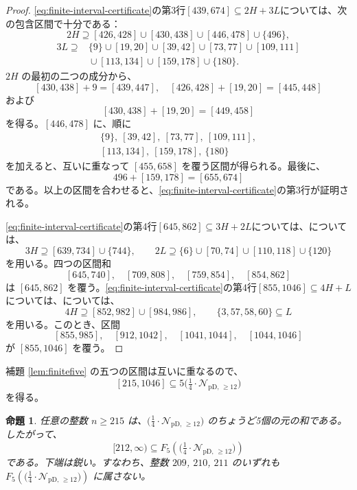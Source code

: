 \documentclass[12pt]{ltjsarticle}
\theoremstyle{plain}
\newtheorem{proposition}[theorem]{命題}
\newcommand{\Pset}{\bigl(\tfrac14\cdot
  \mathcal{N}_{\mathrm{pD},\,\geq12}\bigr)}
\begin{document}
\begin{proof}
\eqref{eq:finite-interval-certificate}の第3行$[439,674]\subseteq2H+3L$については、次の包含区間で十分である：
\[
 2H\supseteq[426,428]\cup[430,438]\cup[446,478]\cup\{496\},
\]
\[
\begin{split}
3L\supseteq{}&\{9\}\cup[19,20]\cup[39,42]\cup[73,77]
 \cup[109,111]\\
 &{}\cup[113,134]\cup[159,178]\cup\{180\}.
\end{split}
\]
$2H$ の最初の二つの成分から、
\[
 [430,438]+9=[439,447],\quad
 [426,428]+[19,20]=[445,448]
\]
および
\[
 [430,438]+[19,20]=[449,458]
\]
を得る。$[446,478]$ に、順に
\[
\begin{gathered}
 \{9\},\ [39,42],\ [73,77],\ [109,111],\\
 [113,134],\ [159,178],\ \{180\}
\end{gathered}
\]
を加えると、互いに重なって $[455,658]$ を覆う区間が得られる。最後に、
\[
 496+[159,178]=[655,674]
\]
である。以上の区間を合わせると、\eqref{eq:finite-interval-certificate}の第3行が証明される。

\eqref{eq:finite-interval-certificate}の第4行$[645,862]\subseteq3H+2L$については、については、
\[
 3H\supseteq[639,734]\cup\{744\},\qquad
 2L\supseteq\{6\}\cup[70,74]\cup[110,118]\cup\{120\}
\]
を用いる。四つの区間和
\[
 [645,740],\quad[709,808],\quad[759,854],\quad[854,862]
\]
は $[645,862]$ を覆う。\eqref{eq:finite-interval-certificate}の第4行$[855,1046]\subseteq4H+L$については、については、
\[
 4H\supseteq[852,982]\cup[984,986],
 \qquad \{3,57,58,60\}\subseteq L
\]
を用いる。このとき、区間
\[
 [855,985],\quad[912,1042],\quad[1041,1044],\quad[1044,1046]
\]
が $[855,1046]$ を覆う。
\end{proof}

補題 \ref{lem:finitefive} の五つの区間は互いに重なるので、
\[
 [215,1046]\subseteq5\Pset
\]
を得る。

\begin{proposition}\label{prop:fiveP}
任意の整数 $n\geq215$ は、$\Pset$ のちょうど5個の元の和である。したがって、
\[
 [212,\infty)\subseteq F_5(\Pset)
\]
である。下端は鋭い。すなわち、整数 $209$, $210$, $211$ のいずれも
$F_5(\Pset)$ に属さない。
\end{proposition}
\end{document}
